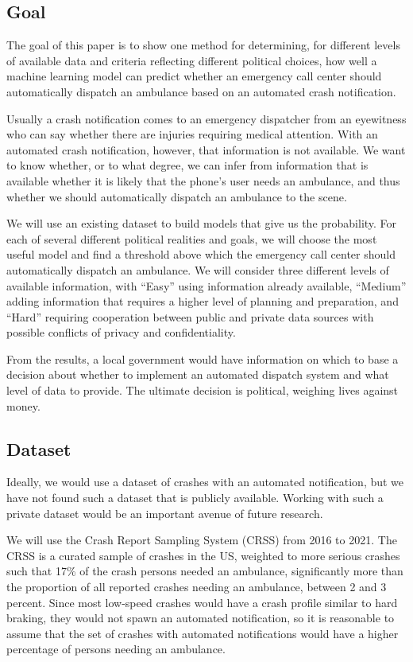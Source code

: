 
\subsection{Goal}

The goal of this paper is to show one method for determining, for different levels of available data and criteria reflecting different political choices, how well a machine learning model can predict whether an emergency call center should automatically dispatch an ambulance based on an automated crash notification.  

Usually a crash notification comes to an emergency dispatcher from an eyewitness who can say whether there are injuries requiring medical attention.  With an automated crash notification, however, that information is not available.  We want to know whether, or to what degree, we can infer from information that is available whether it is likely that the phone's user needs an ambulance, and thus whether we should automatically dispatch an ambulance to the scene.  

We will use an existing dataset to build models that give us the probability.  For each of several different political realities and goals, we will choose the most useful model and find a threshold above which the emergency call center should automatically dispatch an ambulance.  We will consider three different levels of available information, with ``Easy'' using information already available, ``Medium'' adding information that requires a higher level of planning and preparation, and ``Hard'' requiring cooperation between public and private data sources with possible conflicts of privacy and confidentiality.  

From the results, a local government would have information on which to base a decision about whether to implement an automated dispatch system and what level of data to provide.  The ultimate decision is political, weighing lives against money.

\subsection{Dataset}

Ideally, we would use a dataset of crashes with an automated notification, but we have not found such a dataset that is publicly available.  Working with such a private dataset would be an important avenue of future research.

We will use the Crash Report Sampling System (CRSS) from 2016 to 2021.  The CRSS is a curated sample of crashes in the US, weighted to more serious crashes such that 17\% of the crash persons needed an ambulance, significantly more than the proportion of all reported crashes needing an ambulance, between 2 and 3 percent.  Since most low-speed crashes would have a crash profile similar to hard braking, they would not spawn an automated notification, so it is reasonable to assume that the set of crashes with automated notifications would have a higher percentage of persons needing an ambulance.  

